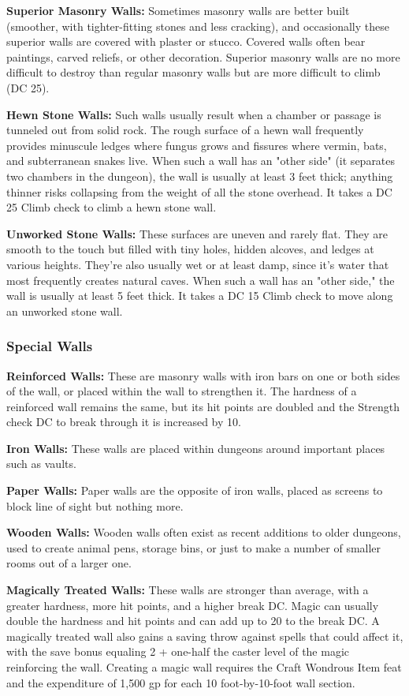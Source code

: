 \textbf{Superior Masonry Walls:} Sometimes masonry walls are better built (smoother, with tighter-fitting stones and less cracking), and occasionally these superior walls are covered with plaster or stucco. Covered walls often bear paintings, carved reliefs, or other decoration. Superior masonry walls are no more difficult to destroy than regular masonry walls but are more difficult to climb (DC 25).

\textbf{Hewn Stone Walls:} Such walls usually result when a chamber or passage is tunneled out from solid rock. The rough surface of a hewn wall frequently provides minuscule ledges where fungus grows and fissures where vermin, bats, and subterranean snakes live. When such a wall has an "other side" (it separates two chambers in the dungeon), the wall is usually at least 3 feet thick; anything thinner risks collapsing from the weight of all the stone overhead. It takes a DC 25 Climb check to climb a hewn stone wall.

\textbf{Unworked Stone Walls:} These surfaces are uneven and rarely flat. They are smooth to the touch but filled with tiny holes, hidden alcoves, and ledges at various heights. They're also usually wet or at least damp, since it's water that most frequently creates natural caves. When such a wall has an "other side," the wall is usually at least 5 feet thick. It takes a DC 15 Climb check to move along an unworked stone wall. 

\subsubsection{Special Walls}

\textbf{Reinforced Walls:} These are masonry walls with iron bars on one or both sides of the wall, or placed within the wall to strengthen it. The hardness of a reinforced wall remains the same, but its hit points are doubled and the Strength check DC to break through it is increased by 10.

\textbf{Iron Walls:} These walls are placed within dungeons around important places such as vaults. 

\textbf{Paper Walls:} Paper walls are the opposite of iron walls, placed as screens to block line of sight but nothing more.

\textbf{Wooden Walls:} Wooden walls often exist as recent additions to older dungeons, used to create animal pens, storage bins, or just to make a number of smaller rooms out of a larger one.

\textbf{Magically Treated Walls:} These walls are stronger than average, with a greater hardness, more hit points, and a higher break DC. Magic can usually double the hardness and hit points and can add up to 20 to the break DC. A magically treated wall also gains a saving throw against spells that could affect it, with the save bonus equaling 2 + one-half the caster level of the magic reinforcing the wall. Creating a magic wall requires the Craft Wondrous Item feat and the expenditure of 1,500 gp for each 10 foot-by-10-foot wall section.

